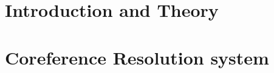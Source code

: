 \documentclass[12pt,a4paper,bibtotoc,idxtotoc,headsepline,footsepline,footexclude,BCOR12mm,DIV13]{scrbook}
\begin{document}
	\frontmatter
	
	
	
%	
%	
	
	
%	
	\clearemptydoublepage
	
	
	
	
	
	


	
   
	\mainmatter
		
	
		
	
		\tableofcontents
	
	
		\part[Introduction and Theory]{Introduction and Theory}
		\label{part:introAndBackgroundTheory}
		
		
		
		\part[Coreference Resolution]{Coreference Resolution system }
		\label{part:secondP}
		
		
		
		
		
		
		
		
		
		\listoftables
		\newpage
		\listoffigures
	

	
  \clearemptydoublepage
 
	
	
	
 
\end{document}
